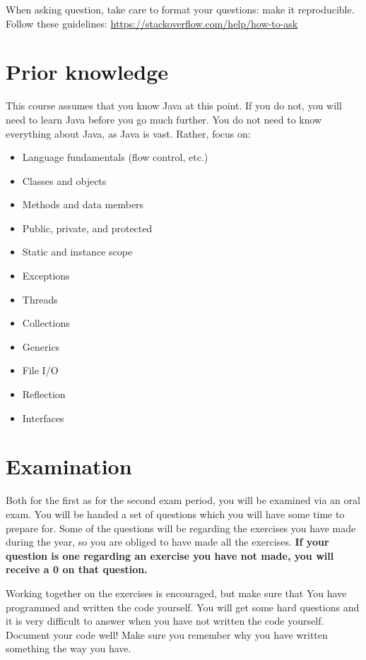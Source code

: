 When asking question, take care to format your questions: make it reproducible. Follow these guidelines: \href{https://stackoverflow.com/help/how-to-ask}{https://stackoverflow.com/help/how-to-ask}

\section{Prior knowledge}
This course assumes that you know Java at this point. If you do not, you will need to learn Java before you go much further. You do not need to know everything about Java, as Java is vast. Rather, focus on:

\begin{itemize}
	\item Language fundamentals (flow control, etc.)
	\item Classes and objects
	\item Methods and data members
	\item Public, private, and protected
	\item Static and instance scope
	\item Exceptions
	\item Threads
	\item Collections
	\item Generics
	\item File I/O
	\item Reflection
	\item Interfaces
\end{itemize}

\section{Examination}
Both for the first as for the second exam period, you will be examined via an oral exam. You will be handed a set of questions which you will have some time to prepare for. Some of the questions will be regarding the exercises you have made during the year, so you are obliged to have made all the exercises. \textbf{If your question is one regarding an exercise you have not made, you will receive a 0 on that question.}

Working together on the exercises is encouraged, but make sure that
You have programmed and written the code yourself. You will get some hard questions and it is very difficult to answer when you have not written the code yourself.
Document your code well! Make sure you remember why you have written something the way you have.

